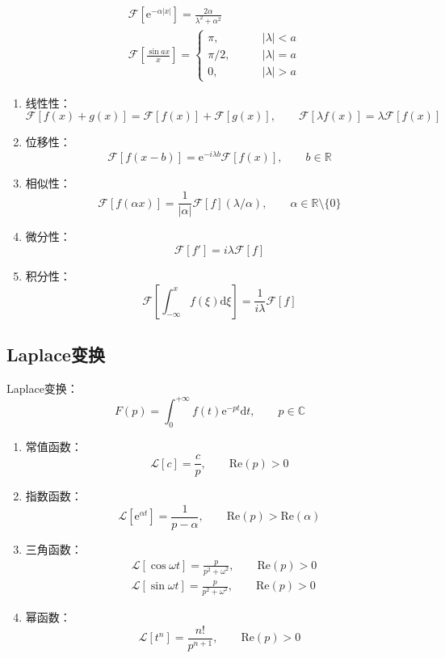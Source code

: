 \documentclass[lang = cn, scheme = chinese, thmcnt = section]{elegantbook}
\newcommand{\R}{\mathbb{R}}            %
\newcommand{\C}{\mathbb{C}}  		   %
\newcommand{\dd}{\mathrm{d}}           %
\newcommand{\ee}[1]{\mathrm{e}^{#1}}   %
\begin{document}
\begin{example}
	\begin{align*}
		& \mathscr{F}\left[\ee{-\alpha|x|}\right]=\frac{2\alpha}{\lambda^2+\alpha^2}\\
		& \mathscr{F}\left[\frac{\sin ax}{x}\right]=\begin{cases}
			\pi,\qquad & |\lambda|<a\\
			\pi/2,\qquad & |\lambda|=a\\
			0,\qquad & |\lambda|>a
		\end{cases}
	\end{align*}
\end{example}

\begin{property}
	\begin{enumerate}
		\item 线性性：
		$$
		\mathscr{F}[f(x)+g(x)]=\mathscr{F}[f(x)]+\mathscr{F}[g(x)],\qquad 
		\mathscr{F}[\lambda f(x)]=\lambda \mathscr{F}[f(x)]
		$$
		\item 位移性：%
		$$
		\mathscr{F}[f(x-b)]=\ee{-i\lambda b}\mathscr{F}[f(x)],\qquad b\in\R
		$$
		\item 相似性：%
		$$
		\mathscr{F}[f(\alpha x)]=\frac{1}{|\alpha|}\mathscr{F}[f](\lambda/\alpha),\qquad \alpha\in\R\setminus\{0\}
		$$
		\item 微分性：
		$$
		\mathscr{F}[f']=i\lambda \mathscr{F}[f]
		$$
		\item 积分性：%
		$$
		\mathscr{F}\left[\int_{-\infty}^{x}f(\xi)\dd\xi\right]=\frac{1}{i\lambda}\mathscr{F}[f]
		$$
	\end{enumerate}
\end{property}

\subsection{Laplace变换}

\begin{note}
	Laplace变换：
	$$
	F(p)=\int_{0}^{+\infty}f(t)\ee{-pt}\dd t,\qquad p\in\C
	$$
\end{note}

\begin{example}
	\begin{enumerate}
		\item 常值函数：%
		$$
		\mathscr{L}[c]=\frac{c}{p},\qquad \text{Re}(p)>0
		$$
		\item 指数函数：%
		$$
		\mathscr{L}[\ee{\alpha t}]=\frac{1}{p-\alpha},\qquad \text{Re}(p)>\text{Re}(\alpha)
		$$
		\item 三角函数：
		\begin{align*}
			& \mathscr{L}[\cos\omega t]=\frac{p}{p^2+\omega^2},\qquad \text{Re}(p)>0\\
			& \mathscr{L}[\sin\omega t]=\frac{p}{p^2+\omega^2},\qquad \text{Re}(p)>0
		\end{align*}
		\item 幂函数：%
		$$
		\mathscr{L}[t^n]=\frac{n!}{p^{n+1}},\qquad \text{Re}(p)>0
		$$
	\end{enumerate}
\end{example}
\end{document}
